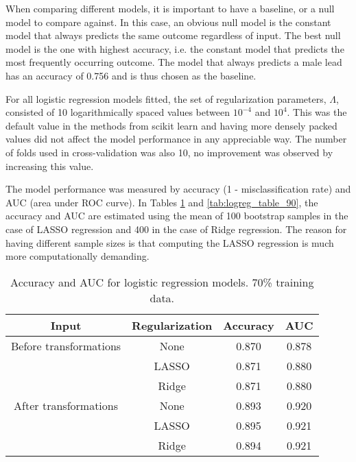\documentclass[../../project.tex]{subfiles}
\begin{document}
	When comparing different models, it is important to have a baseline, or a null model to compare against. In this case, an obvious null model is the constant model that always predicts the same outcome regardless of input. The best null model is the one with highest accuracy, i.e. the constant model that predicts the most frequently occurring outcome. The model that always predicts a male lead has an accuracy of 0.756 and is thus chosen as the baseline.
	
	For all logistic regression models fitted, the set of regularization parameters, $\Lambda$, consisted of 10 logarithmically spaced values between $10^{-4}$ and $10^4$. This was the default value in the methods from scikit learn and having more densely packed values did not affect the model performance in any appreciable way. The number of folds used in cross-validation was also 10, no improvement was observed by increasing this value.
	
	The model performance was measured by accuracy (1 - misclassification rate) and AUC (area under ROC curve). In Tables \ref{tab:logreg_table_70} and \ref{tab:logreg_table_90}, the accuracy and AUC are estimated using the mean of 100 bootstrap samples in the case of LASSO regression and 400 in the case of Ridge regression. The reason for having different sample sizes is that computing the LASSO regression is much more computationally demanding.
	
	\begin{table}[h!]
		\centering
		\begin{tabular}{cccc}
			Input & Regularization & Accuracy & AUC \\
			\midrule
			Before transformations & None & 0.870 & 0.878 \\
			& LASSO & 0.871 & 0.880 \\
			& Ridge & 0.871 & 0.880 \\
			\midrule
			After transformations & None & 0.893 & 0.920 \\
			& LASSO & 0.895 & 0.921 \\
			& Ridge & 0.894 & 0.921 \\
		\end{tabular}
		\caption{Accuracy and AUC for logistic regression models. 70\% training data.}
		\label{tab:logreg_table_70}
	\end{table}
	
\end{document}
